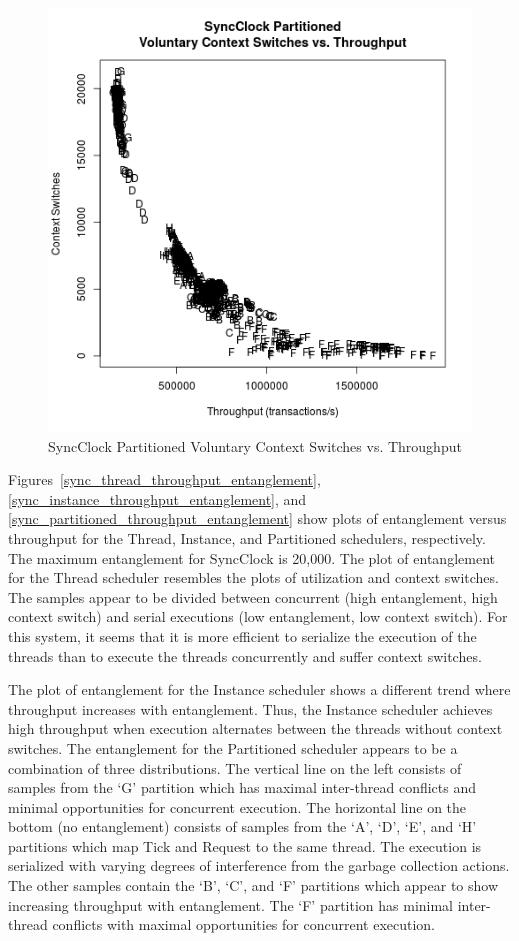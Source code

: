 \begin{figure}
\center
\includegraphics[height=.4\textheight]{sync_partitioned_throughput_context.png}
\caption{SyncClock Partitioned Voluntary Context Switches vs. Throughput}
\label{sync_partitioned_throughput_context}
\end{figure}

Figures~\ref{sync_thread_throughput_entanglement}, \ref{sync_instance_throughput_entanglement}, and \ref{sync_partitioned_throughput_entanglement} show plots of entanglement versus throughput for the Thread, Instance, and Partitioned schedulers, respectively.
The maximum entanglement for SyncClock is 20,000.
The plot of entanglement for the Thread scheduler resembles the plots of utilization and context switches.
The samples appear to be divided between concurrent (high entanglement, high context switch) and serial executions (low entanglement, low context switch).
For this system, it seems that it is more efficient to serialize the execution of the threads than to execute the threads concurrently and suffer context switches.

The plot of entanglement for the Instance scheduler shows a different trend where throughput increases with entanglement.
Thus, the Instance scheduler achieves high throughput when execution alternates between the threads without context switches.
The entanglement for the Partitioned scheduler appears to be a combination of three distributions.
The vertical line on the left consists of samples from the `G' partition which has maximal inter-thread conflicts and minimal opportunities for concurrent execution.
The horizontal line on the bottom (no entanglement) consists of samples from the `A', `D', `E', and `H' partitions which map Tick and Request to the same thread.
The execution is serialized with varying degrees of interference from the garbage collection actions.
The other samples contain the `B', `C', and `F' partitions which appear to show increasing throughput with entanglement.
The `F' partition has minimal inter-thread conflicts with maximal opportunities for concurrent execution.

